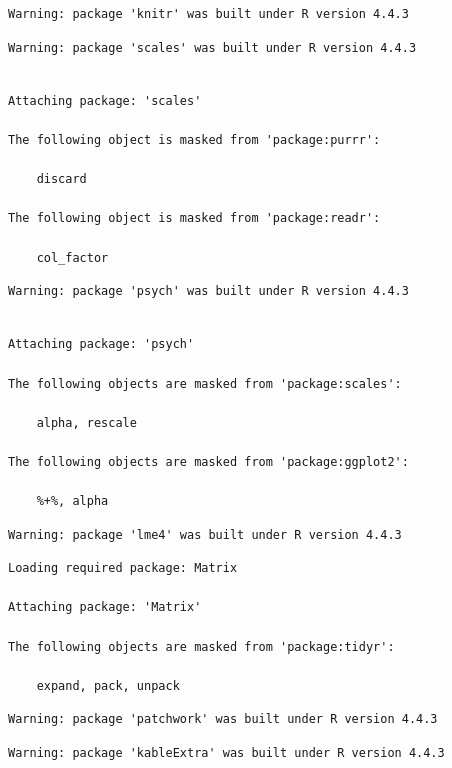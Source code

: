 \documentclass[
]{article}
\begin{document}
\begin{verbatim}
Warning: package 'knitr' was built under R version 4.4.3
\end{verbatim}

\begin{verbatim}
Warning: package 'scales' was built under R version 4.4.3
\end{verbatim}

\begin{verbatim}

Attaching package: 'scales'

The following object is masked from 'package:purrr':

    discard

The following object is masked from 'package:readr':

    col_factor
\end{verbatim}

\begin{verbatim}
Warning: package 'psych' was built under R version 4.4.3
\end{verbatim}

\begin{verbatim}

Attaching package: 'psych'

The following objects are masked from 'package:scales':

    alpha, rescale

The following objects are masked from 'package:ggplot2':

    %+%, alpha
\end{verbatim}

\begin{verbatim}
Warning: package 'lme4' was built under R version 4.4.3
\end{verbatim}

\begin{verbatim}
Loading required package: Matrix

Attaching package: 'Matrix'

The following objects are masked from 'package:tidyr':

    expand, pack, unpack
\end{verbatim}

\begin{verbatim}
Warning: package 'patchwork' was built under R version 4.4.3
\end{verbatim}

\begin{verbatim}
Warning: package 'kableExtra' was built under R version 4.4.3
\end{verbatim}
\end{document}
